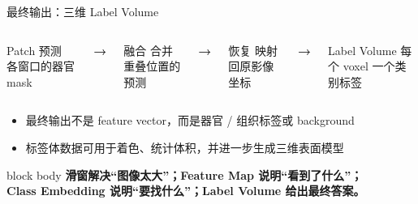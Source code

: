 \documentclass[aspectratio=169,12pt]{beamer}
\newcommand{\takeaway}[1]{%
  \begin{beamercolorbox}[wd=\linewidth,sep=.16cm,center,rounded=true,shadow=true]{block body}
    \textcolor{BeamerDeep}{\textbf{#1}}
  \end{beamercolorbox}
}
\newcommand{\bigarrow}{\textcolor{BeamerRoyal}{\large\bfseries →}}
\begin{document}
\begin{frame}{最终输出：三维 Label Volume}
  \begin{columns}[c,onlytextwidth]
      \begin{block}{Patch 预测}
        \centering 各窗口的器官 mask
      \end{block}
    \centering\bigarrow
      \begin{block}{融合}
        \centering 合并重叠位置的预测
      \end{block}
    \centering\bigarrow
      \begin{block}{恢复}
        \centering 映射回原影像坐标
      \end{block}
    \centering\bigarrow
      \begin{block}{Label Volume}
        \centering 每个 voxel 一个类别标签
      \end{block}
  \end{columns}

  \vspace{0.20cm}
  \begin{itemize}
    \item 最终输出不是 feature vector，而是器官 / 组织标签或 background
    \item 标签体数据可用于着色、统计体积，并进一步生成三维表面模型
  \end{itemize}

  \vspace{0.08cm}
  \takeaway{{\fontsize{11.3}{14.8}\selectfont
    滑窗解决“图像太大”；Feature Map 说明“看到了什么”；\\
    Class Embedding 说明“要找什么”；Label Volume 给出最终答案。}}
\end{frame}
\end{document}

